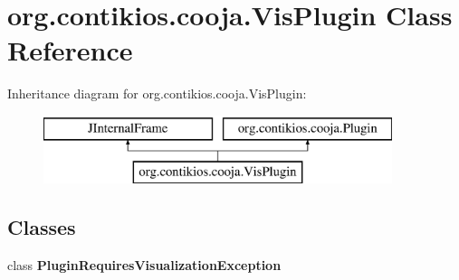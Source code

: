 \hypertarget{classorg_1_1contikios_1_1cooja_1_1VisPlugin}{\section{org.\-contikios.\-cooja.\-Vis\-Plugin Class Reference}
\label{classorg_1_1contikios_1_1cooja_1_1VisPlugin}
}
Inheritance diagram for org.\-contikios.\-cooja.\-Vis\-Plugin\-:\begin{figure}[H]
\begin{center}
\leavevmode
\includegraphics[height=2.000000cm]{classorg_1_1contikios_1_1cooja_1_1VisPlugin}
\end{center}
\end{figure}
\subsection*{Classes}
\begin{DoxyCompactItemize}
\item 
class {\bfseries Plugin\-Requires\-Visualization\-Exception}
\end{DoxyCompactItemize}
